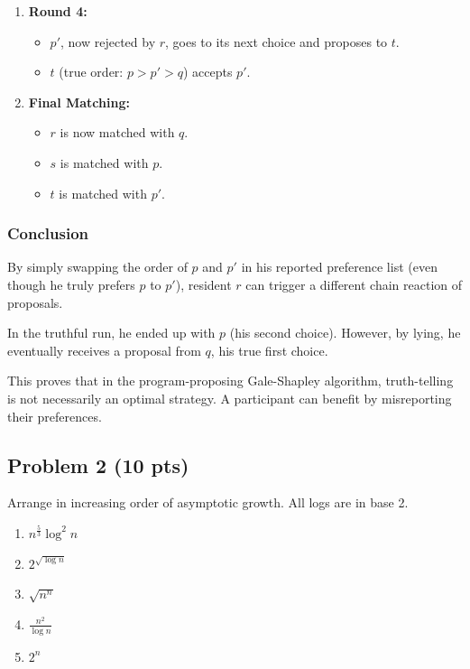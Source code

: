 \documentclass[12pt]{article}
\begin{document}
\begin{enumerate}
    \item \textbf{Round 4:}
    \begin{itemize}
        \item $p'$, now rejected by $r$, goes to its next choice and proposes to $t$.
        \item $t$ (true order: $p > p' > q$) accepts $p'$.
    \end{itemize}

    \item \textbf{Final Matching:}
    \begin{itemize}
        \item $r$ is now matched with $q$.
        \item $s$ is matched with $p$.
        \item $t$ is matched with $p'$.
    \end{itemize}
\end{enumerate}

\subsubsection*{Conclusion}
By simply swapping the order of $p$ and $p'$ in his reported preference list (even though he truly prefers $p$ to $p'$), resident $r$ can trigger a different chain reaction of proposals. 

In the truthful run, he ended up with $p$ (his second choice). However, by lying, he eventually receives a proposal from $q$, his true first choice. 

This proves that in the program-proposing Gale-Shapley algorithm, truth-telling is not necessarily an optimal strategy. A participant can benefit by misreporting their preferences.

\subsection*{Problem 2 (10 pts)}
Arrange in increasing order of asymptotic growth. All logs are in base 2.

\begin{enumerate}
    \item \( n^{\frac{5}{3}} \log^2 n \)
    \item \( 2^{\sqrt{\log n}} \)
    \item \( \sqrt{n^n} \)
    \item \( \frac{n^2}{\log n} \)
    \item \( 2^n \)
\end{enumerate}
\end{document}
